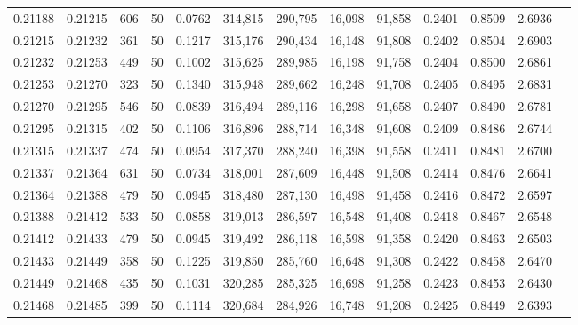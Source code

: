 \begin{tabular}{rrrrrrrrrrrrr}
0.21188 & 0.21215 &   606 &  50 &                                     0.0762 & 314,815 & 290,795 &  16,098 &  91,858 & 0.2401 & 0.8509 & 2.6936 \\
0.21215 & 0.21232 &   361 &  50 &                                     0.1217 & 315,176 & 290,434 &  16,148 &  91,808 & 0.2402 & 0.8504 & 2.6903 \\
0.21232 & 0.21253 &   449 &  50 &                                     0.1002 & 315,625 & 289,985 &  16,198 &  91,758 & 0.2404 & 0.8500 & 2.6861 \\
0.21253 & 0.21270 &   323 &  50 &                                     0.1340 & 315,948 & 289,662 &  16,248 &  91,708 & 0.2405 & 0.8495 & 2.6831 \\
0.21270 & 0.21295 &   546 &  50 &                                     0.0839 & 316,494 & 289,116 &  16,298 &  91,658 & 0.2407 & 0.8490 & 2.6781 \\
0.21295 & 0.21315 &   402 &  50 &                                     0.1106 & 316,896 & 288,714 &  16,348 &  91,608 & 0.2409 & 0.8486 & 2.6744 \\
0.21315 & 0.21337 &   474 &  50 &                                     0.0954 & 317,370 & 288,240 &  16,398 &  91,558 & 0.2411 & 0.8481 & 2.6700 \\
0.21337 & 0.21364 &   631 &  50 &                                     0.0734 & 318,001 & 287,609 &  16,448 &  91,508 & 0.2414 & 0.8476 & 2.6641 \\
0.21364 & 0.21388 &   479 &  50 &                                     0.0945 & 318,480 & 287,130 &  16,498 &  91,458 & 0.2416 & 0.8472 & 2.6597 \\
0.21388 & 0.21412 &   533 &  50 &                                     0.0858 & 319,013 & 286,597 &  16,548 &  91,408 & 0.2418 & 0.8467 & 2.6548 \\
0.21412 & 0.21433 &   479 &  50 &                                     0.0945 & 319,492 & 286,118 &  16,598 &  91,358 & 0.2420 & 0.8463 & 2.6503 \\
0.21433 & 0.21449 &   358 &  50 &                                     0.1225 & 319,850 & 285,760 &  16,648 &  91,308 & 0.2422 & 0.8458 & 2.6470 \\
0.21449 & 0.21468 &   435 &  50 &                                     0.1031 & 320,285 & 285,325 &  16,698 &  91,258 & 0.2423 & 0.8453 & 2.6430 \\
0.21468 & 0.21485 &   399 &  50 &                                     0.1114 & 320,684 & 284,926 &  16,748 &  91,208 & 0.2425 & 0.8449 & 2.6393 \\

\end{tabular}
